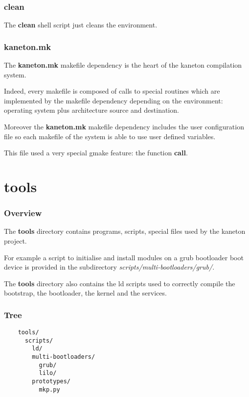 \documentclass[8pt]{beamer}
\newcommand{\nl}[0]{\vspace{0.4cm}}
\begin{document}

\begin{frame}
  \frametitle{clean}

  The \textbf{clean} shell script just cleans the environment.
\end{frame}


\begin{frame}
  \frametitle{kaneton.mk}

  The \textbf{kaneton.mk} makefile dependency is the heart of the
  kaneton compilation system.

  \nl

  Indeed, every makefile is composed of calls to special routines
  which are implemented by the makefile dependency depending on the
  environment: operating system plus architecture source and destination.

  \nl

  Moreover the \textbf{kaneton.mk} makefile dependency includes the
  user configuration file so each makefile of the system is able to
  use user defined variables.

  \nl

  This file used a very special gmake feature: the function \textbf{call}.
\end{frame}

%
%

\section{tools}


\begin{frame}
  \frametitle{Overview}

  The \textbf{tools} directory contains programs, scripts, special
  files used by the kaneton project.

  \nl

  For example a script to initialise and install modules on a grub
  bootloader boot device is provided in the subdirectory
  \textit{scripts/multi-bootloaders/grub/}.

  \nl

  The \textbf{tools} directory also contains the ld scripts used
  to correctly compile the bootstrap, the bootloader, the kernel
  and the services.
\end{frame}


\begin{frame}[containsverbatim]
  \frametitle{Tree}

  \begin{verbatim}
    tools/
      scripts/
        ld/
        multi-bootloaders/
          grub/
          lilo/
        prototypes/
          mkp.py
  \end{verbatim}
\end{frame}
\end{document}
